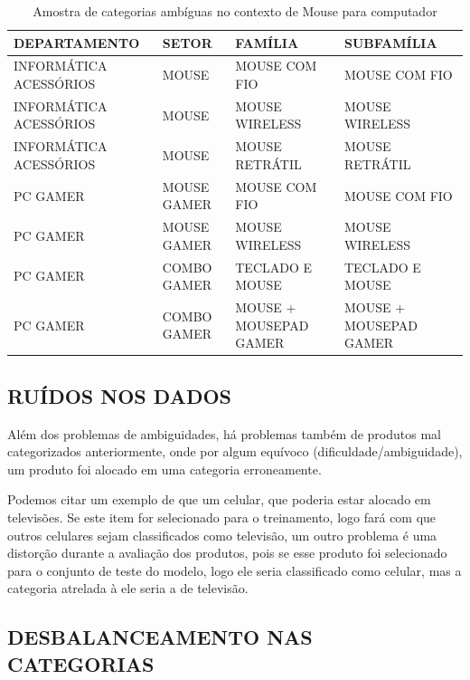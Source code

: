 \begin{table}[h]
    \centering
    \caption{Amostra de categorias ambíguas no contexto de Mouse para computador}
    \tiny
    \begin{tabularx}{\textwidth}{X|X|X|X} 
        \textbf{DEPARTAMENTO} & \textbf{SETOR} & \textbf{FAMÍLIA} & \textbf{SUBFAMÍLIA} \\ \hline
        INFORMÁTICA ACESSÓRIOS & MOUSE & MOUSE COM FIO & MOUSE COM FIO \\ \hline
        INFORMÁTICA ACESSÓRIOS & MOUSE & MOUSE WIRELESS & MOUSE WIRELESS \\ \hline
        INFORMÁTICA ACESSÓRIOS & MOUSE & MOUSE RETRÁTIL & MOUSE RETRÁTIL \\ \hline
        PC GAMER & MOUSE GAMER & MOUSE COM FIO & MOUSE COM FIO \\ \hline
        PC GAMER & MOUSE GAMER & MOUSE WIRELESS & MOUSE WIRELESS \\ \hline
        PC GAMER & COMBO GAMER & TECLADO E MOUSE & TECLADO E MOUSE \\ \hline
        PC GAMER & COMBO GAMER & MOUSE + MOUSEPAD GAMER & MOUSE + MOUSEPAD GAMER
    \end{tabularx}
    \label{tab:ambiguidades}
\end{table}

\subsection{RUÍDOS NOS DADOS}

Além dos problemas de ambiguidades, há problemas também de produtos mal categorizados anteriormente, onde por algum equívoco (dificuldade/ambiguidade), um produto foi alocado em uma categoria erroneamente.

Podemos citar um exemplo de que um celular, que poderia estar alocado em televisões. Se este item for selecionado para o treinamento, logo fará com que outros celulares sejam classificados como televisão, um outro problema é uma distorção durante a avaliação dos produtos, pois se esse produto foi selecionado para o conjunto de teste do modelo, logo ele seria classificado como celular, mas a categoria atrelada à ele seria a de televisão.

\subsection{DESBALANCEAMENTO NAS CATEGORIAS}

